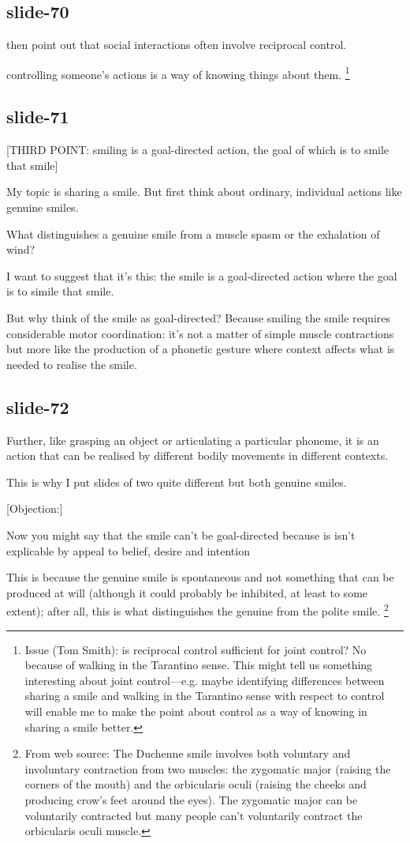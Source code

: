 \documentclass[12pt,\papersize]{extarticle}
\begin{document}
\subsection{slide-70}
then point out that social interactions often involve reciprocal control.

controlling someone's actions is a way of knowing things about them.
\footnote{
Issue (Tom Smith): is reciprocal control sufficient for joint control?  No because of walking in the Tarantino sense.  This might tell us something interesting about joint control---e.g. maybe identifying differences between sharing a smile and walking in the Tarantino sense with respect to control will enable me to make the point about control as a way of knowing in sharing a smile better.
}

\subsection{slide-71}
[THIRD POINT: smiling is a goal-directed action, the goal of which is to smile that smile]

My topic is sharing a smile.  But first think about ordinary, individual actions like genuine smiles.

What distinguishes a genuine smile from a muscle spasm or the exhalation of wind?

I want to suggest that it's this: the smile is a goal-directed action where the goal is to simile that smile.

But why think of the smile as goal-directed?  Because smiling the smile requires considerable motor coordination: it’s not a matter of simple muscle contractions but more like the production of a phonetic gesture where context affects what is needed to realise the smile.

\subsection{slide-72}
Further, like grasping an object or articulating a particular phoneme, it is an action that can be realised by different bodily movements in different contexts.

This is why I put slides of two quite different but both genuine smiles.

[Objection:]

Now you might say that the smile can't be goal-directed because is isn't explicable by appeal to belief, desire and intention

This is because the genuine smile is spontaneous and not something that can be produced at will (although it could probably be inhibited, at least to some extent); after all, this is what distinguishes the genuine from the polite smile.
\footnote{
From web source: The Duchenne smile involves both voluntary and involuntary contraction from two muscles: the zygomatic major (raising the corners of the mouth) and the orbicularis oculi (raising the cheeks and producing crow's feet around the eyes). The zygomatic major can be voluntarily contracted but many people can't voluntarily contract the orbicularis oculi muscle.
}
\end{document}
